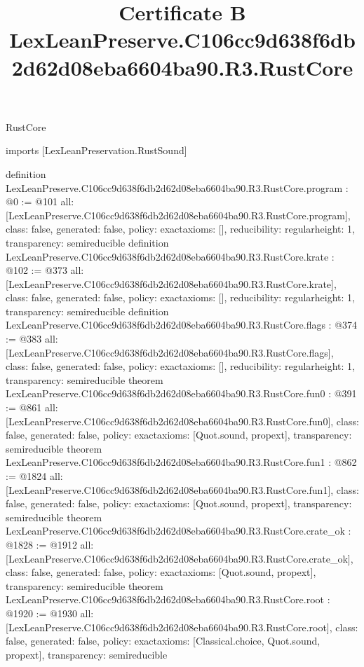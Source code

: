 \begin{lexlean}{RustCore}
\title{Certificate B LexLeanPreserve.C106cc9d638f6db2d62d08eba6604ba90.R3.RustCore}
\begin{coremodule}
imports [LexLeanPreservation.RustSound]

definition LexLeanPreserve.C106cc9d638f6db2d62d08eba6604ba90.R3.RustCore.program : @0 := @101 {
  all: [LexLeanPreserve.C106cc9d638f6db2d62d08eba6604ba90.R3.RustCore.program],
  class: false,
  generated: false,
  policy: exact{axioms: []},
  reducibility: regular{height: 1},
  transparency: semireducible
}
definition LexLeanPreserve.C106cc9d638f6db2d62d08eba6604ba90.R3.RustCore.krate : @102 := @373 {
  all: [LexLeanPreserve.C106cc9d638f6db2d62d08eba6604ba90.R3.RustCore.krate],
  class: false,
  generated: false,
  policy: exact{axioms: []},
  reducibility: regular{height: 1},
  transparency: semireducible
}
definition LexLeanPreserve.C106cc9d638f6db2d62d08eba6604ba90.R3.RustCore.flags : @374 := @383 {
  all: [LexLeanPreserve.C106cc9d638f6db2d62d08eba6604ba90.R3.RustCore.flags],
  class: false,
  generated: false,
  policy: exact{axioms: []},
  reducibility: regular{height: 1},
  transparency: semireducible
}
theorem LexLeanPreserve.C106cc9d638f6db2d62d08eba6604ba90.R3.RustCore.fun0 : @391 := @861 {
  all: [LexLeanPreserve.C106cc9d638f6db2d62d08eba6604ba90.R3.RustCore.fun0],
  class: false,
  generated: false,
  policy: exact{axioms: [Quot.sound, propext]},
  transparency: semireducible
}
theorem LexLeanPreserve.C106cc9d638f6db2d62d08eba6604ba90.R3.RustCore.fun1 : @862 := @1824 {
  all: [LexLeanPreserve.C106cc9d638f6db2d62d08eba6604ba90.R3.RustCore.fun1],
  class: false,
  generated: false,
  policy: exact{axioms: [Quot.sound, propext]},
  transparency: semireducible
}
theorem LexLeanPreserve.C106cc9d638f6db2d62d08eba6604ba90.R3.RustCore.crate_ok : @1828 := @1912 {
  all: [LexLeanPreserve.C106cc9d638f6db2d62d08eba6604ba90.R3.RustCore.crate_ok],
  class: false,
  generated: false,
  policy: exact{axioms: [Quot.sound, propext]},
  transparency: semireducible
}
theorem LexLeanPreserve.C106cc9d638f6db2d62d08eba6604ba90.R3.RustCore.root : @1920 := @1930 {
  all: [LexLeanPreserve.C106cc9d638f6db2d62d08eba6604ba90.R3.RustCore.root],
  class: false,
  generated: false,
  policy: exact{axioms: [Classical.choice, Quot.sound, propext]},
  transparency: semireducible
}


\end{coremodule}
\end{lexlean}
